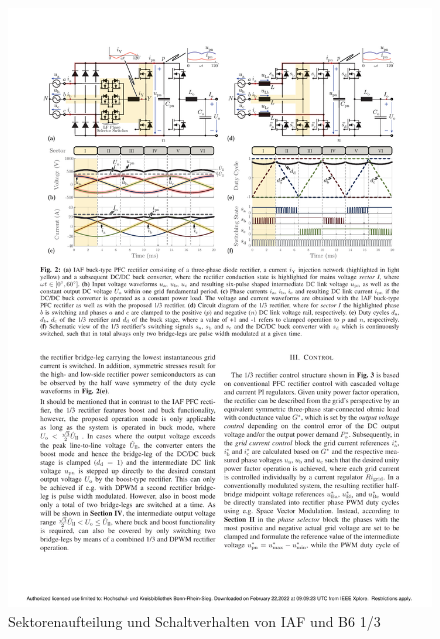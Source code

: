 	\begin{figure}
		\centering
		\includegraphics[width=1\linewidth]{content/Grafiken/B6+IAF_Sectors}
		\caption{Sektorenaufteilung und Schaltverhalten von IAF und B6 1/3 \cite{13PWMPFC}}
		\label{fig:b6iafsectors}
	\end{figure}
	
	
	
